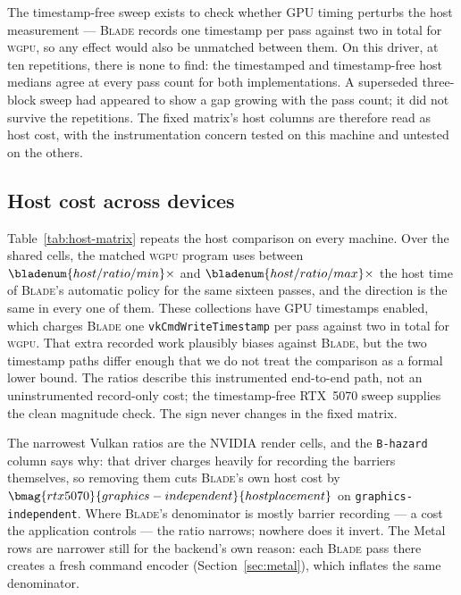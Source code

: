 \documentclass[10pt,twocolumn]{article}
\newcommand{\blade}{\textsc{Blade}}
\newcommand{\wgpu}{\textsc{wgpu}}
\begin{document}
The timestamp-free sweep exists to check whether GPU timing perturbs the host
measurement --- \blade{} records one timestamp per pass against two in total
for \wgpu{}, so any effect would also be unmatched between them. On this
driver, at ten repetitions, there is none to find: the timestamped and
timestamp-free host medians agree at every pass count for both
implementations. A superseded three-block sweep had appeared to show a gap
growing with the pass count; it did not survive the repetitions. The fixed
matrix's host columns are therefore read as host cost, with the
instrumentation concern tested on this machine and untested on the others.

\subsection{Host cost across devices}



Table~\ref{tab:host-matrix} repeats the host comparison on every machine. Over
the  shared cells, the matched \wgpu{} program uses
between
$\bladenum{host/ratio/min}\times$ and $\bladenum{host/ratio/max}\times$ the
host time of \blade's automatic policy for the same sixteen passes, and the
direction is the same in every one of them.\hostcaveatinline{} These collections have GPU
timestamps enabled, which charges \blade{} one \texttt{vkCmdWriteTimestamp} per
pass against two in total for \wgpu. That extra recorded work plausibly biases
against \blade{}, but the two timestamp paths differ enough that we do not
treat the comparison as a formal lower bound. The ratios describe this
instrumented end-to-end path, not an uninstrumented record-only cost; the
timestamp-free RTX~5070 sweep supplies the clean magnitude check. The sign
never changes in the fixed matrix.

The narrowest Vulkan ratios are the NVIDIA render cells, and the
\texttt{B-hazard} column says why: that driver charges heavily for recording
the barriers themselves, so removing them cuts \blade's own host cost by
$\bmag{rtx5070}{graphics-independent}{hostplacement}$ on
\texttt{graphics-independent}. Where \blade's denominator is mostly barrier
recording --- a cost the application controls --- the ratio narrows; nowhere
does it invert. The Metal rows are narrower still for the backend's own
reason: each \blade{} pass there creates a fresh command encoder
(Section~\ref{sec:metal}), which inflates the same denominator.
\end{document}
